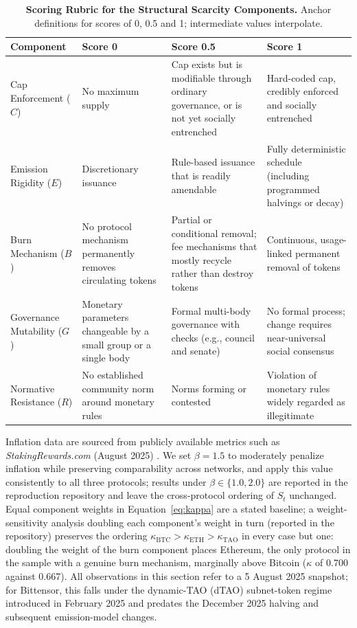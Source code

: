 \documentclass[12pt]{article}
\begin{document}
\begin{table}[H]
\centering
\caption{\textbf{Scoring Rubric for the Structural Scarcity Components.} Anchor definitions for scores of 0, 0.5 and 1; intermediate values interpolate.}
\label{tab:scoring_rubric}
\renewcommand{\arraystretch}{1.3}
\small
\begin{tabular}{@{}>{\raggedright\arraybackslash}p{2.6cm} >{\raggedright\arraybackslash}p{3.9cm} >{\raggedright\arraybackslash}p{4.2cm} >{\raggedright\arraybackslash}p{4.2cm}@{}}
\toprule
\rowcolor{gray!15}
\textbf{Component} & \textbf{Score 0} & \textbf{Score 0.5} & \textbf{Score 1} \\
\midrule
Cap Enforcement (\(C\)) & No maximum supply & Cap exists but is modifiable through ordinary governance, or is not yet socially entrenched & Hard-coded cap, credibly enforced and socially entrenched \\
Emission Rigidity (\(E\)) & Discretionary issuance & Rule-based issuance that is readily amendable & Fully deterministic schedule (including programmed halvings or decay) \\
Burn Mechanism (\(B\)) & No protocol mechanism permanently removes circulating tokens & Partial or conditional removal; fee mechanisms that mostly recycle rather than destroy tokens & Continuous, usage-linked permanent removal of tokens \\
Governance Mutability (\(G\)) & Monetary parameters changeable by a small group or a single body & Formal multi-body governance with checks (e.g., council and senate) & No formal process; change requires near-universal social consensus \\
Normative Resistance (\(R\)) & No established community norm around monetary rules & Norms forming or contested & Violation of monetary rules widely regarded as illegitimate \\
\bottomrule
\end{tabular}
\end{table}

Inflation data are sourced from publicly available metrics such as \textit{StakingRewards.com} (August 2025) \citep{stakingrewards2025eth}. We set \( \beta = 1.5 \) to moderately penalize inflation while preserving comparability across networks, and apply this value consistently to all three protocols; results under \( \beta \in \{1.0, 2.0\} \) are reported in the reproduction repository and leave the cross-protocol ordering of \( S_t \) unchanged. Equal component weights in Equation~\ref{eq:kappa} are a stated baseline; a weight-sensitivity analysis doubling each component's weight in turn (reported in the repository) preserves the ordering \( \kappa_{\text{BTC}} > \kappa_{\text{ETH}} > \kappa_{\text{TAO}} \) in every case but one: doubling the weight of the burn component places Ethereum, the only protocol in the sample with a genuine burn mechanism, marginally above Bitcoin (\( \kappa \) of 0.700 against 0.667). All observations in this section refer to a 5 August 2025 snapshot; for Bittensor, this falls under the dynamic-TAO (dTAO) subnet-token regime introduced in February 2025 and predates the December 2025 halving and subsequent emission-model changes.
\end{document}
